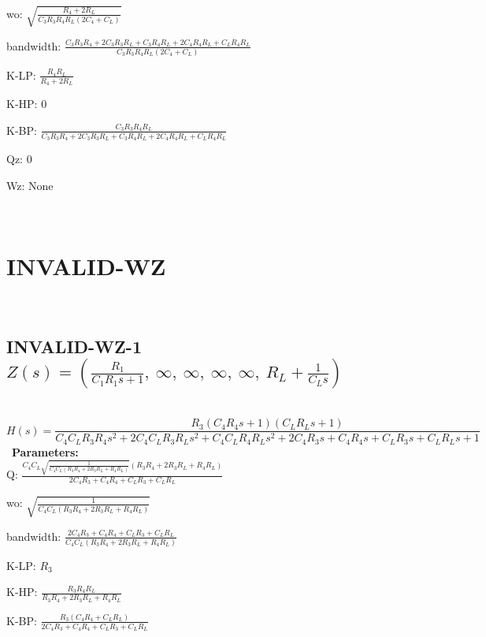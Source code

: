 \documentclass{article}
\begin{document}
wo: $\sqrt{\frac{R_{4} + 2 R_{L}}{C_{3} R_{3} R_{4} R_{L} \left(2 C_{4} + C_{L}\right)}}$\ 

bandwidth: $\frac{C_{3} R_{3} R_{4} + 2 C_{3} R_{3} R_{L} + C_{3} R_{4} R_{L} + 2 C_{4} R_{4} R_{L} + C_{L} R_{4} R_{L}}{C_{3} R_{3} R_{4} R_{L} \left(2 C_{4} + C_{L}\right)}$\ 

K-LP: $\frac{R_{4} R_{L}}{R_{4} + 2 R_{L}}$\ 

K-HP: $0$\ 

K-BP: $\frac{C_{3} R_{3} R_{4} R_{L}}{C_{3} R_{3} R_{4} + 2 C_{3} R_{3} R_{L} + C_{3} R_{4} R_{L} + 2 C_{4} R_{4} R_{L} + C_{L} R_{4} R_{L}}$\ 

Qz: $0$\ 

Wz: $\text{None}$\ 

\ 

\section{INVALID-WZ}\ 
\subsection{INVALID-WZ-1 $Z(s) = \left( \frac{R_{1}}{C_{1} R_{1} s + 1}, \  \infty, \  \infty, \  \infty, \  \infty, \  R_{L} + \frac{1}{C_{L} s}\right)$ } \ 
\textbf{\[H(s) = \frac{R_{3} \left(C_{4} R_{4} s + 1\right) \left(C_{L} R_{L} s + 1\right)}{C_{4} C_{L} R_{3} R_{4} s^{2} + 2 C_{4} C_{L} R_{3} R_{L} s^{2} + C_{4} C_{L} R_{4} R_{L} s^{2} + 2 C_{4} R_{3} s + C_{4} R_{4} s + C_{L} R_{3} s + C_{L} R_{L} s + 1}\] } \ 
\textbf{Parameters:}\\ 

Q: $\frac{C_{4} C_{L} \sqrt{\frac{1}{C_{4} C_{L} \left(R_{3} R_{4} + 2 R_{3} R_{L} + R_{4} R_{L}\right)}} \left(R_{3} R_{4} + 2 R_{3} R_{L} + R_{4} R_{L}\right)}{2 C_{4} R_{3} + C_{4} R_{4} + C_{L} R_{3} + C_{L} R_{L}}$\ 

wo: $\sqrt{\frac{1}{C_{4} C_{L} \left(R_{3} R_{4} + 2 R_{3} R_{L} + R_{4} R_{L}\right)}}$\ 

bandwidth: $\frac{2 C_{4} R_{3} + C_{4} R_{4} + C_{L} R_{3} + C_{L} R_{L}}{C_{4} C_{L} \left(R_{3} R_{4} + 2 R_{3} R_{L} + R_{4} R_{L}\right)}$\ 

K-LP: $R_{3}$\ 

K-HP: $\frac{R_{3} R_{4} R_{L}}{R_{3} R_{4} + 2 R_{3} R_{L} + R_{4} R_{L}}$\ 

K-BP: $\frac{R_{3} \left(C_{4} R_{4} + C_{L} R_{L}\right)}{2 C_{4} R_{3} + C_{4} R_{4} + C_{L} R_{3} + C_{L} R_{L}}$\ 
\end{document}
